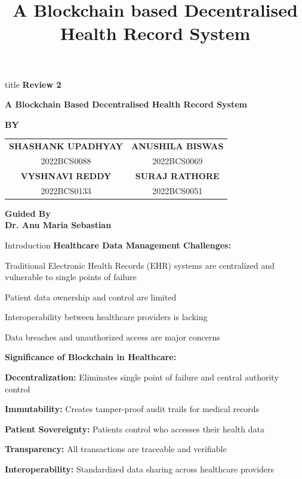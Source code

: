 \documentclass[10pt]{beamer}
\title{A Blockchain based Decentralised Health Record System}
\author{}
\institute{}
\date{}
\let\olditemize\itemize
\let\endolditemize\enditemize
\renewenvironment{itemize}
  {\olditemize\justifying}
  {\endolditemize}
\begin{document}
\begin{frame}
\vfill
\begin{center}
\hspace{2cm}
\begin{beamercolorbox}[rounded=true,shadow=true,wd=0.9\textwidth,center,dp=0.5ex,ht=3ex]{title}
{\Large \textbf{Review 2}}
\end{beamercolorbox}

\vspace{0.5cm}
{\large \textbf{A Blockchain Based Decentralised Health Record System}}

\vspace{0.8cm}

\textbf{BY}\\[0.5cm]
\begin{tabular}{cc}
\textbf{SHASHANK UPADHYAY} & \textbf{ANUSHILA BISWAS} \\
2022BCS0088 & 2022BCS0069 \\[0.3cm]
\textbf{VYSHNAVI REDDY} & \textbf{SURAJ RATHORE} \\
2022BCS0133 & 2022BCS0051
\end{tabular}

\vspace{0.8cm}

{\large \textbf{Guided By}}\\[0.2cm]
{\Large \textbf{Dr. Anu Maria Sebastian}}
\end{center}
\vfill
\end{frame}

\begin{frame}{Introduction}
\textbf{Healthcare Data Management Challenges:}
\begin{itemize}
\item Traditional Electronic Health Records (EHR) systems are centralized and vulnerable to single points of failure
\item Patient data ownership and control are limited
\item Interoperability between healthcare providers is lacking
\item Data breaches and unauthorized access are major concerns
\end{itemize}

\vspace{0.5cm}
\textbf{Significance of Blockchain in Healthcare:}
\begin{itemize}
\item \textbf{Decentralization:} Eliminates single point of failure and central authority control
\item \textbf{Immutability:} Creates tamper-proof audit trails for medical records
\item \textbf{Patient Sovereignty:} Patients control who accesses their health data
\item \textbf{Transparency:} All transactions are traceable and verifiable
\item \textbf{Interoperability:} Standardized data sharing across healthcare providers
\end{itemize}
\end{frame}
\end{document}
